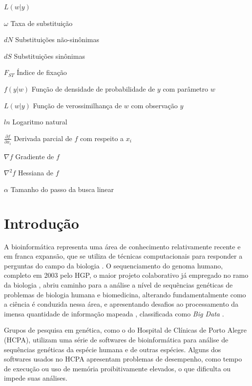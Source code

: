 \documentclass[cic,tc]{iiufrgs}
\begin{document}
\begin{listofsymbols}{$L(w|y)$}
    \item[$\omega$] Taxa de substituição
    \item[$dN$] Substituições não-sinônimas
    \item[$dS$] Substituições sinônimas
    \item[$F_{ST}$] Índice de fixação
    \item[$f(y|w)$] Função de densidade de probabilidade de $y$ com parâmetro $w$
    \item[$L(w|y)$] Função de verossimilhança de $w$ com observação $y$
    \item[$ln$] Logaritmo natural
    \item[$\frac{\partial f}{\partial x_i}$] Derivada parcial de $f$ com respeito a $x_i$
    \item[$\nabla f$] Gradiente de $f$
    \item[$\nabla^2 f$] Hessiana de $f$
    \item[$\alpha$] Tamanho do passo da busca linear
\end{listofsymbols}

\tableofcontents

%
%
%
%

\chapter{Introdução}
\label{chap:intro}

%
%
A bioinformática representa uma área de conhecimento relativamente recente e em
franca expansão, que se utiliza de técnicas computacionais para responder a
perguntas do campo da biologia \cite{baxevanis2020bioinformatics}. O
sequenciamento do genoma humano, completo em 2003 pelo HGP, o maior projeto
colaborativo já empregado no ramo da biologia \cite{tripp2011economic}, abriu
caminho para a análise a nível de sequências genéticas de problemas de biologia
humana e biomedicina, alterando fundamentalmente como a ciência é conduzida
nessa área, e apresentando desafios ao processamento da imensa quantidade de
informação mapeada \cite{baxevanis2020bioinformatics}, classificada como
\textit{Big Data} \cite{nsr2014bigdata} \cite{stephens2015big}.

%
%
Grupos de pesquisa em genética, como o do Hospital de Clínicas de Porto Alegre
(HCPA), utilizam uma série de softwares de bioinformática para análise de
sequências genéticas da espécie humana e de outras espécies. Alguns dos
softwares usados no HCPA apresentam problemas de desempenho, como tempo de
execução ou uso de memória proibitivamente elevados, o que dificulta ou impede
suas análises.
\end{document}
